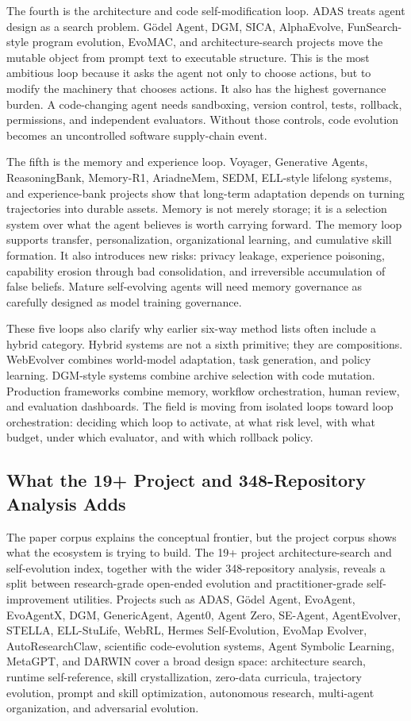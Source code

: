 The fourth is the architecture and code self-modification loop. ADAS treats agent design as a search problem. Gödel Agent, DGM, SICA, AlphaEvolve, FunSearch-style program evolution, EvoMAC, and architecture-search projects move the mutable object from prompt text to executable structure. This is the most ambitious loop because it asks the agent not only to choose actions, but to modify the machinery that chooses actions. It also has the highest governance burden. A code-changing agent needs sandboxing, version control, tests, rollback, permissions, and independent evaluators. Without those controls, code evolution becomes an uncontrolled software supply-chain event.

The fifth is the memory and experience loop. Voyager, Generative Agents, ReasoningBank, Memory-R1, AriadneMem, SEDM, ELL-style lifelong systems, and experience-bank projects show that long-term adaptation depends on turning trajectories into durable assets. Memory is not merely storage; it is a selection system over what the agent believes is worth carrying forward. The memory loop supports transfer, personalization, organizational learning, and cumulative skill formation. It also introduces new risks: privacy leakage, experience poisoning, capability erosion through bad consolidation, and irreversible accumulation of false beliefs. Mature self-evolving agents will need memory governance as carefully designed as model training governance.

These five loops also clarify why earlier six-way method lists often include a hybrid category. Hybrid systems are not a sixth primitive; they are compositions. WebEvolver combines world-model adaptation, task generation, and policy learning. DGM-style systems combine archive selection with code mutation. Production frameworks combine memory, workflow orchestration, human review, and evaluation dashboards. The field is moving from isolated loops toward loop orchestration: deciding which loop to activate, at what risk level, with what budget, under which evaluator, and with which rollback policy.

\subsection{What the 19+ Project and 348-Repository Analysis Adds}

The paper corpus explains the conceptual frontier, but the project corpus shows what the ecosystem is trying to build. The 19+ project architecture-search and self-evolution index, together with the wider 348-repository analysis, reveals a split between research-grade open-ended evolution and practitioner-grade self-improvement utilities. Projects such as ADAS, Gödel Agent, EvoAgent, EvoAgentX, DGM, GenericAgent, Agent0, Agent Zero, SE-Agent, AgentEvolver, STELLA, ELL-StuLife, WebRL, Hermes Self-Evolution, EvoMap Evolver, AutoResearchClaw, scientific code-evolution systems, Agent Symbolic Learning, MetaGPT, and DARWIN cover a broad design space: architecture search, runtime self-reference, skill crystallization, zero-data curricula, trajectory evolution, prompt and skill optimization, autonomous research, multi-agent organization, and adversarial evolution.

